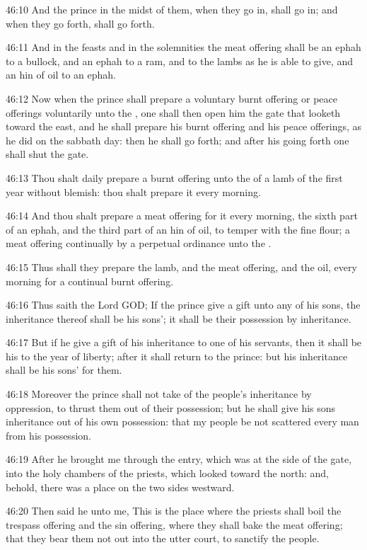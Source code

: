 46:10 And the prince in the midst of them, when they go in, shall go
in; and when they go forth, shall go forth.

46:11 And in the feasts and in the solemnities the meat offering shall
be an ephah to a bullock, and an ephah to a ram, and to the lambs as
he is able to give, and an hin of oil to an ephah.

46:12 Now when the prince shall prepare a voluntary burnt offering or
peace offerings voluntarily unto the \LORD, one shall then open him the
gate that looketh toward the east, and he shall prepare his burnt
offering and his peace offerings, as he did on the sabbath day: then
he shall go forth; and after his going forth one shall shut the gate.

46:13 Thou shalt daily prepare a burnt offering unto the \LORD of a
lamb of the first year without blemish: thou shalt prepare it every
morning.

46:14 And thou shalt prepare a meat offering for it every morning, the
sixth part of an ephah, and the third part of an hin of oil, to temper
with the fine flour; a meat offering continually by a perpetual
ordinance unto the \LORD.

46:15 Thus shall they prepare the lamb, and the meat offering, and the
oil, every morning for a continual burnt offering.

46:16 Thus saith the Lord GOD; If the prince give a gift unto any of
his sons, the inheritance thereof shall be his sons'; it shall be
their possession by inheritance.

46:17 But if he give a gift of his inheritance to one of his servants,
then it shall be his to the year of liberty; after it shall return to
the prince: but his inheritance shall be his sons' for them.

46:18 Moreover the prince shall not take of the people's inheritance
by oppression, to thrust them out of their possession; but he shall
give his sons inheritance out of his own possession: that my people be
not scattered every man from his possession.

46:19 After he brought me through the entry, which was at the side of
the gate, into the holy chambers of the priests, which looked toward
the north: and, behold, there was a place on the two sides westward.

46:20 Then said he unto me, This is the place where the priests shall
boil the trespass offering and the sin offering, where they shall bake
the meat offering; that they bear them not out into the utter court,
to sanctify the people.

